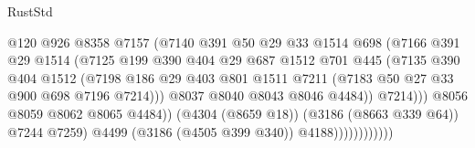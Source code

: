 \begin{lexlean}{RustStd}
\begin{coremodule}
                                      @120
                                      @926
                                      @8358
                                      @7157
                                      (@7140
                                        @391
                                        @50
                                        @29
                                        @33
                                        @1514
                                        @698
                                        (@7166
                                          @391
                                          @29
                                          @1514
                                          (@7125
                                            @199
                                            @390
                                            @404
                                            @29
                                            @687
                                            @1512
                                            @701
                                            @445
                                            (@7135
                                              @390
                                              @404
                                              @1512
                                              (@7198
                                                @186
                                                @29
                                                @403
                                                @801
                                                @1511
                                                @7211
                                                (@7183 @50 @27 @33 @900 @698 @7196 @7214)))
                                            @8037
                                            @8040
                                            @8043
                                            @8046
                                            @4484))
                                        @7214)))
                                  @8056
                                  @8059
                                  @8062
                                  @8065
                                  @4484))
                              (@4304 (@8659 @18))
                              (@3186 (@8663 @339 @64))
                              @7244
                              @7259)
                            @4499
                            (@3186 (@4505 @399 @340))
                            @4188))))))))))))

\end{coremodule}
\end{lexlean}
